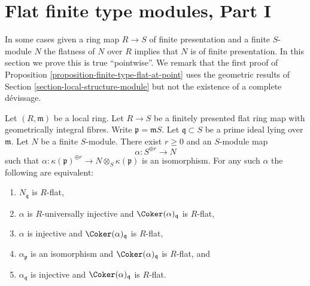 \section{Flat finite type modules, Part I}
\label{section-finite-type-flat-I}

\noindent
In some cases given a ring map $R \to S$ of finite presentation and
a finite $S$-module $N$ the flatness of $N$ over $R$ implies that $N$
is of finite presentation. In this section we prove this is true
``pointwise''. We remark that the first proof of
Proposition \ref{proposition-finite-type-flat-at-point}
uses the geometric results of
Section \ref{section-local-structure-module}
but not the existence of a complete d\'evissage.

\begin{lemma}
\label{lemma-induction-step}
Let $(R, \mathfrak m)$ be a local ring. Let $R \to S$ be a finitely presented
flat ring map with geometrically integral fibres. Write
$\mathfrak p = \mathfrak mS$. Let $\mathfrak q \subset S$ be a prime ideal
lying over $\mathfrak m$. Let $N$ be a finite $S$-module.
There exist $r \geq 0$ and an $S$-module map
$$
\alpha : S^{\oplus r} \longrightarrow N
$$
such that
$\alpha : \kappa(\mathfrak p)^{\oplus r} \to N \otimes_S \kappa(\mathfrak p)$
is an isomorphism. For any such $\alpha$ the following are equivalent:
\begin{enumerate}
\item $N_{\mathfrak q}$ is $R$-flat,
\item $\alpha$ is $R$-universally injective and
$\Coker(\alpha)_{\mathfrak q}$ is $R$-flat,
\item $\alpha$ is injective and
$\Coker(\alpha)_{\mathfrak q}$ is $R$-flat,
\item $\alpha_{\mathfrak p}$ is an isomorphism and
$\Coker(\alpha)_{\mathfrak q}$ is $R$-flat, and
\item $\alpha_{\mathfrak q}$ is injective and
$\Coker(\alpha)_{\mathfrak q}$ is $R$-flat.
\end{enumerate}
\end{lemma}

